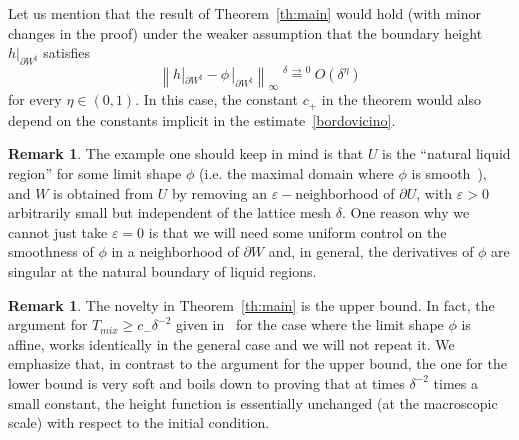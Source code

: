 \documentclass[10pt]{amsart}
\theoremstyle{definition}\newtheorem{defi}[theo]{Definition}\newtheorem{rema}[theo]{Remark}\newtheorem{exam}[theo]{Example}\newtheorem{exem}[theo]{Example}\newtheorem{nota}[theo]{Notation}
\renewcommand{\d}{{\sharp }}
\begin{document}
Let us mention that the result of Theorem~\ref{th:main} would hold (with minor changes in the proof) under the weaker assumption that the boundary height $h|_{\partial W^\d}$ satisfies
\begin{equation}\label{bordovicino}
\left\|h|_{\partial W^\d}-\phi\,|_{\partial W^\d}\right\|_\infty\stackrel {\delta\,\to\,0}=O(\delta^\eta)
\end{equation}
for every $\eta\in (0,1)$. In this case, the constant $c_+$ in the theorem would also depend on the constants implicit in the estimate~\eqref{bordovicino}.



\begin{rema}
The example one should keep in mind is that $U$ is the ``natural liquid region'' for some limit shape $\phi$ (i.e. the maximal domain where $\phi$ is smooth~\cite{KO}), and $W$ is obtained from $U$ by removing an $\varepsilon-$neighborhood of $\partial U$, with $\varepsilon>0$ arbitrarily small but independent of the lattice mesh $\delta$. One reason why we cannot just take $\varepsilon=0$ is that we will need some uniform control on the smoothness of $\phi$ in a neighborhood of $\partial W$ and, in general, the derivatives of $\phi$ are singular at the natural boundary of liquid regions.
\end{rema}

\begin{rema}
The novelty in Theorem~\ref{th:main} is the upper bound. In fact, the argument for $T_{mix}\ge c_-\delta^{-2}$ given in~\cite[Sec.~5.2]{LT_ptrf} for the case where the limit shape $\phi$ is affine, works identically in the general case and we will not repeat it. We emphasize that, in contrast to the argument for the upper bound, the one for the lower bound is very soft and boils down to proving that at times $\delta^{-2}$ times a small constant, the height function is essentially unchanged (at the macroscopic scale) with respect to the initial condition.
\end{rema}
\end{document}
